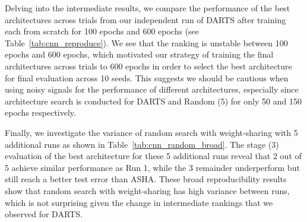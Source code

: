 \documentclass[acmlarge, nonacm]{acmart}
\begin{document}
\begin{table*}[h]
    \centering
     \caption{\textbf{CIFAR-10 Benchmark: Broad Reproducibility of Random Search WS}  We report the  stage 3 performance of the final architecture from 6 independent runs of random search with weight-sharing.  \\\hspace{\textwidth}
 $^\dagger$ This run was performed using the DARTS code before we corrected for non-determinism (see Appendix~\ref{ssec:appendix_reproduce}).  }
    \label{tab:cnn_random_broad}
   
\end{table*}
Delving into the intermediate results, we compare the performance of the best architectures across trials from our independent run of DARTS  after training each from scratch for 100 epochs and 600 epochs (see Table~\ref{tab:cnn_reproduce}).    We see that the ranking is unstable between 100 epochs and 600 epochs, which motivated our strategy of training the final architectures across trials to 600 epochs in order to select the best architecture for final evaluation across 10 seeds.  This suggests we should be cautious when using noisy signals for the performance of different architectures, especially since architecture search is conducted for DARTS and Random (5) for only 50 and 150 epochs respectively.

Finally, we investigate the variance of random search with weight-sharing with 5 additional runs as shown in  Table~\ref{tab:cnn_random_broad}.  The stage (3) evaluation of the best architecture for these 5 additional runs reveal that 2 out of 5 achieve similar performance as Run 1, while the 3 remainder underperform but still reach a better test error than ASHA.  These broad reproducibility results show that random search with weight-sharing has high variance between runs, which is not surprising given the change in intermediate rankings that we observed for DARTS.   
\end{document}
